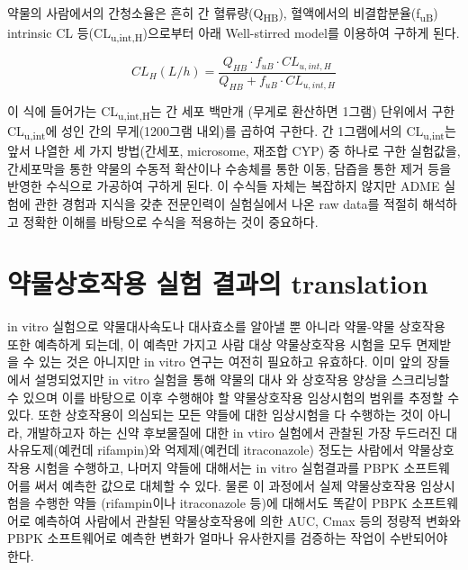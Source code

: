 \documentclass[
  11pt,
  krantz2, a4paper, twoside]{krantz}
\begin{document}
약물의 사람에서의 간청소율은 흔히 간 혈류량(Q\textsubscript{HB}), 혈액에서의
비결합분율(f\textsubscript{uB}) intrinsic CL 등(CL\textsubscript{u,int,H})으로부터 아래 Well-stirred
model를 이용하여 구하게 된다.

\begin{equation}
{CL}_{H}(L/h) = \frac{Q_{HB} \cdot f_{uB} \cdot {CL}_{u,int,H}}{Q_{HB} + f_{uB} \cdot {CL}_{u,int,H}}
\label{eq:eq08-01} 
\end{equation}

이 식에 들어가는 CL\textsubscript{u,int,H}는 간 세포 백만개 (무게로 환산하면 1그램)
단위에서 구한 CL\textsubscript{u,int}에 성인 간의 무게(1200그램 내외)를 곱하여 구한다.
간 1그램에서의 CL\textsubscript{u,int}는 앞서 나열한 세 가지 방법(간세포, microsome,
재조합 CYP) 중 하나로 구한 실험값을, 간세포막을 통한 약물의 수동적
확산이나 수송체를 통한 이동, 담즙을 통한 제거 등을 반영한 수식으로
가공하여 구하게 된다. 이 수식들 자체는 복잡하지 않지만 ADME 실험에 관한
경험과 지식을 갖춘 전문인력이 실험실에서 나온 raw data를 적절히 해석하고
정확한 이해를 바탕으로 수식을 적용하는 것이 중요하다.

\hypertarget{uxc57duxbb3cuxc0c1uxd638uxc791uxc6a9-uxc2e4uxd5d8-uxacb0uxacfcuxc758-translation}{%
\section{약물상호작용 실험 결과의 translation}\label{uxc57duxbb3cuxc0c1uxd638uxc791uxc6a9-uxc2e4uxd5d8-uxacb0uxacfcuxc758-translation}}

in vitro 실험으로 약물대사속도나 대사효소를 알아낼 뿐 아니라 약물-약물
상호작용 또한 예측하게 되는데, 이 예측만 가지고 사람 대상 약물상호작용
시험을 모두 면제받을 수 있는 것은 아니지만 in vitro 연구는 여전히
필요하고 유효하다. 이미 앞의 장들에서 설명되었지만 in vitro 실험을 통해
약물의 대사 와 상호작용 양상을 스크리닝할 수 있으며 이를 바탕으로 이후
수행해야 할 약물상호작용 임상시험의 범위를 추정할 수 있다. 또한
상호작용이 의심되는 모든 약들에 대한 임상시험을 다 수행하는 것이 아니라,
개발하고자 하는 신약 후보물질에 대한 in vtiro 실험에서 관찰된 가장
두드러진 대사유도제(예컨데 rifampin)와 억제제(예컨데 itraconazole)
정도는 사람에서 약물상호작용 시험을 수행하고, 나머지 약들에 대해서는 in
vitro 실험결과를 PBPK 소프트웨어를 써서 예측한 값으로 대체할 수 있다.
물론 이 과정에서 실제 약물상호작용 임상시험을 수행한 약들 (rifampin이나
itraconazole 등)에 대해서도 똑같이 PBPK 소프트웨어로 예측하여 사람에서
관찰된 약물상호작용에 의한 AUC, Cmax 등의 정량적 변화와 PBPK
소프트웨어로 예측한 변화가 얼마나 유사한지를 검증하는 작업이 수반되어야
한다.
\end{document}
